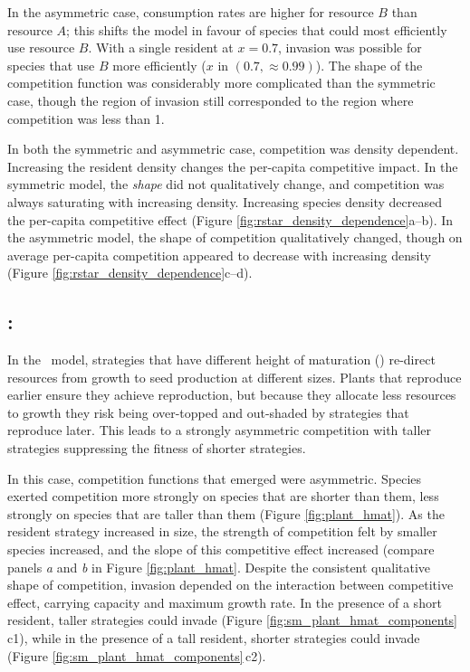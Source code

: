 \documentclass[a4paper,11pt]{article}
\begin{document}
In the asymmetric case, consumption rates are higher for resource $B$ than resource $A$; this shifts the model in favour of species that could most efficiently use resource $B$.
%
With a single resident at $x = 0.7$, invasion was possible for species that use $B$ more efficiently ($x$ in $(0.7, \approx 0.99)$).
%
The shape of the competition function was considerably more complicated than the symmetric case, though the region of invasion still corresponded to the region where competition was less than 1.

In both the symmetric and asymmetric case, competition was density dependent.  Increasing the resident density changes the per-capita competitive impact.
%
In the symmetric model, the \emph{shape} did not qualitatively change,
and competition was always saturating with increasing density.
Increasing species density decreased the per-capita competitive effect
(Figure \ref{fig:rstar_density_dependence}a--b).
%
In the asymmetric model, the shape of competition qualitatively changed, though on average per-capita competition appeared to decrease with increasing density (Figure \ref{fig:rstar_density_dependence}c--d).

\subsection{\plant: \hmat}

In the \plant\ model, strategies that have different height of maturation (\hmat) re-direct resources from growth to seed production at different sizes.  
Plants that reproduce earlier ensure they achieve reproduction, but because they allocate less resources to growth they risk being over-topped and out-shaded by strategies that reproduce later.
This leads to a strongly asymmetric competition with taller strategies suppressing the fitness of shorter strategies.

In this case, competition functions that emerged were asymmetric. Species exerted competition more strongly on species that are shorter than them, less strongly on species that are taller than them (Figure \ref{fig:plant_hmat}).
As the resident strategy increased in size, the strength of competition felt by smaller species increased, and the slope of this competitive effect increased (compare panels \textit{a} and \textit{b} in Figure \ref{fig:plant_hmat}.
%
Despite the consistent qualitative shape of competition, invasion depended on the interaction between competitive effect, carrying capacity and maximum growth rate. In the presence of a short resident, taller strategies could invade (Figure \ref{fig:sm_plant_hmat_components}\,c1), while in the presence of a tall resident, shorter strategies could invade (Figure \ref{fig:sm_plant_hmat_components}\,c2).
\end{document}
